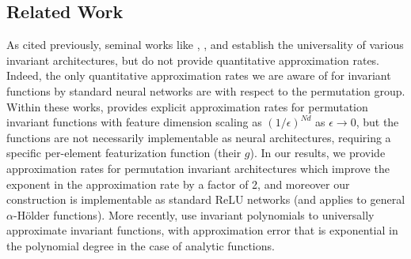 \documentclass[twoside,11pt]{article}
\newcommand{\nd}[1]{{\color{red}{\bf[Nadav:} 
#1{\bf]}}}
\begin{document}
\iffalse
\subsection{Related Work}




As cited previously, seminal works like \citet{maron2019universality}, \citet{zaheer2017deep}, and \citet{Yarotsky2022InvariantMaps} establish the universality of various invariant architectures, but do not provide quantitative approximation rates. Indeed, the only quantitative approximation rates we are aware of for invariant functions by standard neural networks are with respect to the permutation group. Within these works, \citet{han2022universal} provides explicit approximation rates for permutation invariant functions with feature dimension scaling  as $(1/\epsilon)^{Nd}$ as $\epsilon \rightarrow 0$,
 but the functions are not necessarily implementable as neural architectures, requiring a specific per-element featurization function (their $g$). In our results, we provide approximation rates for permutation invariant architectures which improve the exponent in the approximation rate by a factor of 2, and moreover our construction is  implementable as standard ReLU networks (and applies to general $\alpha$-H\"older functions). More recently, \citet{bachmayr2024polynomial} use invariant polynomials to universally approximate invariant functions, with approximation error that is exponential in the polynomial degree in the case of analytic functions. %

\end{document}
